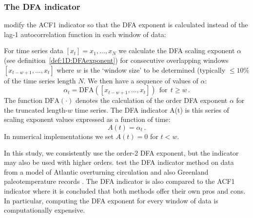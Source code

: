{\subsubsection{The DFA indicator}

\citet{livina2007} modify the ACF1 indicator so that the DFA exponent is calculated instead of the lag-1 autocorrelation function in each window of data:
\begin{definition} 
	\label{def:1D:indicator:DFA}
	For time series data $[x_t] = x_1, ..., x_N$ we calculate the DFA scaling exponent $\alpha$ (see definition~\ref{def:1D:DFAexponent}) for consecutive overlapping windows $[x_{t-w+1},...,x_t]$ where $w$ is the `window size' to be determined (typically $\leq 10\%$ of the time series length $N$. We then have a sequence of values of $\alpha$:
	\begin{equation}
	\label{eqn:1D:DFAfingerprinting}
		\alpha_t = \text{DFA}([x_{t-w+1},...,x_t]) ~~\text{for}~~t\geq w\,.
	\end{equation}
	The function $\text{DFA}(\cdot)$ denotes the calculation of the order DFA exponent $\alpha$ for the truncated length-$w$ time series. The DFA indicator A(t) is this series of scaling exponent values expressed as a function of time:
	\begin{equation}
		A(t) = \alpha_t\,.
	\end{equation}
	In numerical implementations we set $A(t)=0$ for $t<w$.
\end{definition}
In this study, we consistently use the order-2 DFA exponent, but the indicator may also be used with higher orders. \citet{livina2007} test the DFA indicator method on data from a model of Atlantic overturning circulation \citep{edwards2005} and also Greenland paleotemperature records \citep{alley2000}. The DFA indicator is also compared to the ACF1 indicator \citep{lenton2012} where it is concluded that both methods offer their own pros and cons. In particular, computing the DFA exponent for every window of data is computationally expensive. 

}
